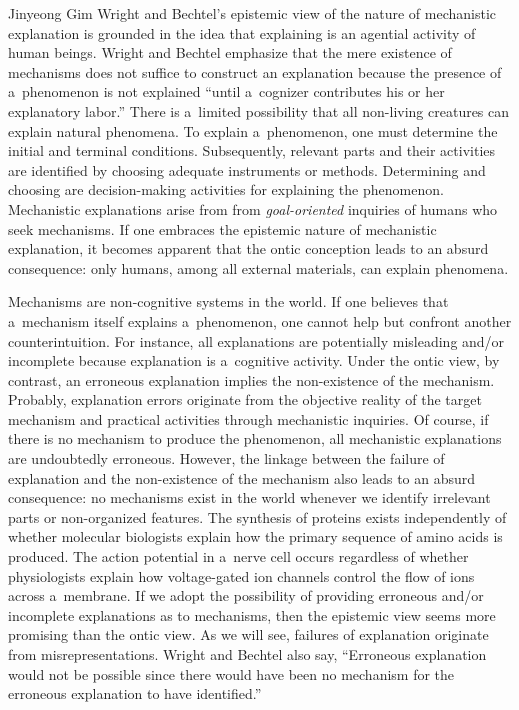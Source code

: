 \begin{artengenv}{Jinyeong Gim}
Wright and Bechtel's epistemic view of the nature of mechanistic explanation is grounded in the idea that explaining is an agential activity of human beings. Wright and Bechtel
\parencite*[][p.51]{wright_mechanisms_2007} %
 emphasize that the mere existence of mechanisms does not suffice to construct an explanation because the presence of a~phenomenon is not explained ``until a~cognizer contributes his or her explanatory labor.'' There is a~limited possibility that all non-living creatures can explain natural phenomena. To explain a~phenomenon, one must determine the initial and terminal conditions. Subsequently, relevant parts and their activities are identified by choosing adequate instruments or methods. Determining and choosing are decision-making activities for explaining the phenomenon. Mechanistic explanations arise from from \textit{goal-oriented} inquiries of humans who seek mechanisms. If one embraces the epistemic nature of mechanistic explanation, it becomes apparent that the ontic conception leads to an absurd consequence: only humans, among all external materials, can explain phenomena.

Mechanisms are non-cognitive systems in the world. If one believes that a~mechanism itself explains a~phenomenon, one cannot help but confront another counterintuition. For instance, all explanations are potentially misleading and/or incomplete because explanation is a~cognitive activity. Under the ontic view, by contrast, an erroneous explanation implies the non-existence of the mechanism. Probably, explanation errors originate from the objective reality of the target mechanism and practical activities through mechanistic inquiries. Of course, if there is no mechanism to produce the phenomenon, all mechanistic explanations are undoubtedly erroneous. However, the linkage between the failure of explanation and the non-existence of the mechanism also leads to an absurd consequence: no mechanisms exist in the world whenever we identify irrelevant parts or non-organized features. The synthesis of proteins exists independently of whether molecular biologists explain how the primary sequence of amino acids is produced. The action potential in a~nerve cell occurs regardless of whether physiologists explain how voltage-gated ion channels control the flow of ions across a~membrane. If we adopt the possibility of providing erroneous and/or incomplete explanations as to mechanisms, then the epistemic view seems more promising than the ontic view. As we will see, failures of explanation originate from misrepresentations. Wright and Bechtel
\parencite*[][p.51, fn.10]{wright_mechanisms_2007} %
 also say, ``Erroneous explanation would not be possible since there would have been no mechanism for the erroneous explanation to have identified.''


\end{artengenv}
